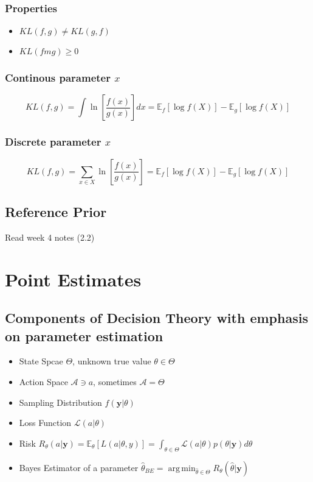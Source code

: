 \documentclass[12pt]{article}
\theoremstyle{definition}
\DeclareMathOperator*{\argmin}{arg\,min}
\begin{document}
        \subsubsection*{Properties}
        \begin{itemize}
            \item $KL(f,g) \neq KL(g,f)$
            \item $KL(fmg) \geq 0$
        \end{itemize}
        \subsubsection*{Continous parameter $x$}
        $$KL(f,g) = \int \ln\left[\frac{f(x)}{g(x)}\right]dx = \mathbb{E}_f[\log f(X)] - \mathbb{E}_g[\log f(X)]$$
        \subsubsection*{Discrete parameter $x$}
        $$KL(f,g) = \sum_{x\in X} \ln\left[\frac{f(x)}{g(x)}\right] = \mathbb{E}_f[\log f(X)] - \mathbb{E}_g[\log f(X)]$$
    \subsection*{Reference Prior} Read week 4 notes (2.2)

\section{Point Estimates}
	\subsection*{Components of Decision Theory with emphasis on parameter estimation}
		\begin{itemize}
			\item State Spcae $\Theta$, unknown true value $\theta \in \Theta$
			\item Action Space $\mathcal{A} \ni a$, sometimes $\mathcal{A} = \Theta$
			\item Sampling Distribution $f(\bm{y}| \theta)$
			\item Loss Function $\mathcal{L}(a|\theta)$
			\item Risk $R_\theta(a|\bm{y}) = \mathbb{E}_\theta[L(a|\theta,y)] = \int_{\theta \in \Theta} \mathcal{L}(a|\theta)p(\theta|\bm{y})d\theta$
			\item Bayes Estimator of a parameter $\hat{\theta}_{BE} = \argmin_{\hat{\theta} \in \Theta} R_\theta(\hat{\theta}|\bm{y})$
		\end{itemize}
\end{document}
